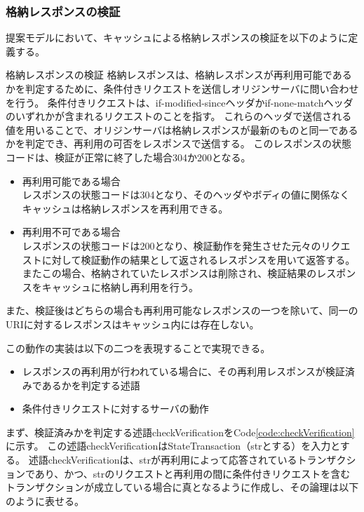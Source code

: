 \documentclass[12pt,a4paper]{jbook}
\begin{document}
\subsubsection{格納レスポンスの検証}
\label{sec:CacheVerification}
提案モデルにおいて、キャッシュによる格納レスポンスの検証を以下のように定義する。

\begin{itembox}[l]{格納レスポンスの検証}
格納レスポンスは、格納レスポンスが再利用可能であるかを判定するために、条件付きリクエストを送信しオリジンサーバに問い合わせを行う。
条件付きリクエストは、if-modified-sinceヘッダかif-none-matchヘッダのいずれかが含まれるリクエストのことを指す。
これらのヘッダで送信される値を用いることで、オリジンサーバは格納レスポンスが最新のものと同一であるかを判定でき、再利用の可否をレスポンスで送信する。
このレスポンスの状態コードは、検証が正常に終了した場合304か200となる。
\begin{itemize}
\item 再利用可能である場合 \\
レスポンスの状態コードは304となり、そのヘッダやボディの値に関係なくキャッシュは格納レスポンスを再利用できる。
\item 再利用不可である場合 \\
レスポンスの状態コードは200となり、検証動作を発生させた元々のリクエストに対して検証動作の結果として返されるレスポンスを用いて返答する。
またこの場合、格納されていたレスポンスは削除され、検証結果のレスポンスをキャッシュに格納し再利用を行う。
\end{itemize}
また、検証後はどちらの場合も再利用可能なレスポンスの一つを除いて、同一のURIに対するレスポンスはキャッシュ内には存在しない。
\end{itembox}

この動作の実装は以下の二つを表現することで実現できる。
\begin{itemize}
\item レスポンスの再利用が行われている場合に、その再利用レスポンスが検証済みであるかを判定する述語
\item 条件付きリクエストに対するサーバの動作
\end{itemize}

まず、検証済みかを判定する述語checkVerificationをCode\ref{code:checkVerification}に示す。
この述語checkVerificationはStateTransaction（strとする）を入力とする。
述語checkVerificationは、strが再利用によって応答されているトランザクションであり、かつ、strのリクエストと再利用の間に条件付きリクエストを含むトランザクションが成立している場合に真となるように作成し、その論理は以下のように表せる。
\end{document}
